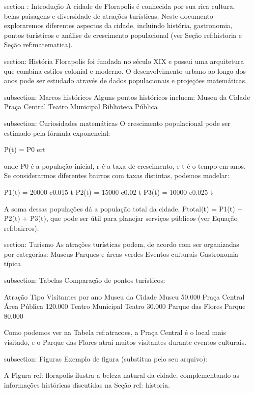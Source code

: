 \documentclass[12pt]{article}
\begin{document}

section : {Introdução}
A cidade de Florapolis é conhecida por sua rica cultura, belas paisagens e diversidade de atrações turísticas.  
Neste documento exploraremos diferentes aspectos da cidade, incluindo história, gastronomia, pontos turísticos e análise de crescimento populacional (ver Seção ref:historia e Seção ref:matematica).

section: História
Florapolis foi fundada no século XIX e possui uma arquitetura que combina estilos colonial e moderno.  
O desenvolvimento urbano ao longo dos anos pode ser estudado através de dados populacionais e projeções matemáticas.

subsection: Marcos históricos
Alguns pontos históricos incluem:
     Museu da Cidade
     Praça Central
     Teatro Municipal
     Biblioteca Pública


subsection: Curiosidades matemáticas
O crescimento populacional pode ser estimado pela fórmula exponencial:


P(t) = P0 e{rt} 

onde P0 é a população inicial, r é a taxa de crescimento, e t é o tempo em anos.  
Se considerarmos diferentes bairros com taxas distintas, podemos modelar:

P1(t) = 20000  e{0.015 t} 
P2(t) = 15000  e{0.02 t} 
P3(t) = 10000  e{0.025 t}

A soma dessas populações dá a população total da cidade, P{total}(t) = P1(t) + P2(t) + P3(t), que pode ser útil para planejar serviços públicos (ver Equação ref:bairros).

section: Turismo
As atrações turísticas podem, de acordo com %
ser organizadas por categorias:
     Museus
     Parques e áreas verdes
     Eventos culturais
     Gastronomia típica

subsection: Tabelas
Comparação de pontos turísticos:


Atração  Tipo  Visitantes por ano 
Museu da Cidade  Museu  50.000 
Praça Central  Área Pública  120.000 
Teatro Municipal  Teatro  30.000 
Parque das Flores  Parque  80.000 

Como podemos ver na Tabela ref:atracoes, a Praça Central é o local mais visitado, e o Parque das Flores atrai muitos visitantes durante eventos culturais.

subsection: Figuras
Exemplo de figura (substitua pelo seu arquivo):


A Figura ref: florapolis ilustra a beleza natural da cidade, complementando as informações históricas discutidas na Seção ref: historia.
\end{document}
